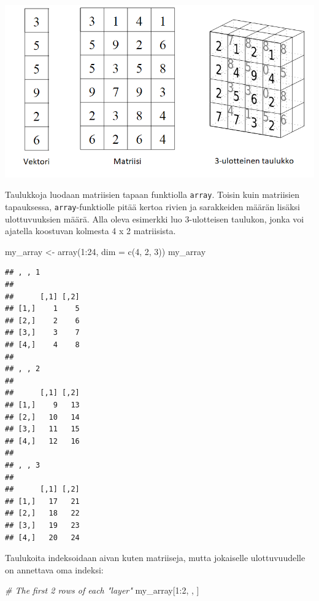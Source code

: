 \documentclass[
]{book}
\newenvironment{Shaded}{\begin{snugshade}}{\end{snugshade}}
\newcommand{\AttributeTok}[1]{\textcolor[rgb]{0.77,0.63,0.00}{#1}}
\newcommand{\CommentTok}[1]{\textcolor[rgb]{0.56,0.35,0.01}{\textit{#1}}}
\newcommand{\DecValTok}[1]{\textcolor[rgb]{0.00,0.00,0.81}{#1}}
\newcommand{\FunctionTok}[1]{\textcolor[rgb]{0.00,0.00,0.00}{#1}}
\newcommand{\NormalTok}[1]{#1}
\newcommand{\OtherTok}[1]{\textcolor[rgb]{0.56,0.35,0.01}{#1}}
\newcommand{\SpecialCharTok}[1]{\textcolor[rgb]{0.00,0.00,0.00}{#1}}
\begin{document}
\includegraphics{files/array.png}

Taulukkoja luodaan matriisien tapaan funktiolla \texttt{array}. Toisin kuin matriisien tapauksessa, \texttt{array}-funktiolle pitää kertoa rivien ja sarakkeiden määrän lisäksi ulottuvuuksien määrä. Alla oleva esimerkki luo 3-ulotteisen taulukon, jonka voi ajatella koostuvan kolmesta 4 x 2 matriisista.

\begin{Shaded}
\begin{Highlighting}[]
\NormalTok{my\_array }\OtherTok{\textless{}{-}} \FunctionTok{array}\NormalTok{(}\DecValTok{1}\SpecialCharTok{:}\DecValTok{24}\NormalTok{, }\AttributeTok{dim =} \FunctionTok{c}\NormalTok{(}\DecValTok{4}\NormalTok{, }\DecValTok{2}\NormalTok{, }\DecValTok{3}\NormalTok{))}
\NormalTok{my\_array}
\end{Highlighting}
\end{Shaded}

\begin{verbatim}
## , , 1
## 
##      [,1] [,2]
## [1,]    1    5
## [2,]    2    6
## [3,]    3    7
## [4,]    4    8
## 
## , , 2
## 
##      [,1] [,2]
## [1,]    9   13
## [2,]   10   14
## [3,]   11   15
## [4,]   12   16
## 
## , , 3
## 
##      [,1] [,2]
## [1,]   17   21
## [2,]   18   22
## [3,]   19   23
## [4,]   20   24
\end{verbatim}

Taulukoita indeksoidaan aivan kuten matriiseja, mutta jokaiselle ulottuvuudelle on annettava oma indeksi:

\begin{Shaded}
\begin{Highlighting}[]
\CommentTok{\# The first 2 rows of each "layer"}
\NormalTok{my\_array[}\DecValTok{1}\SpecialCharTok{:}\DecValTok{2}\NormalTok{, , ]}
\end{Highlighting}
\end{Shaded}
\end{document}
